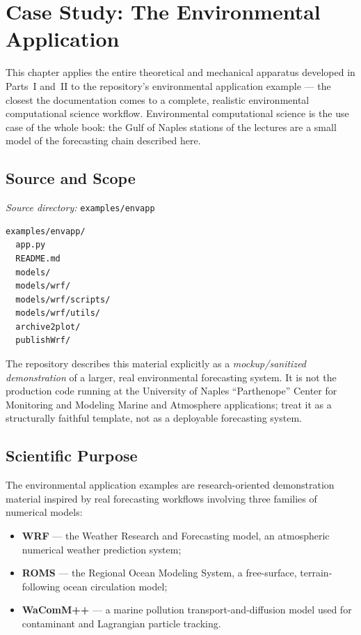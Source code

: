 \chapter{Case Study: The Environmental Application}
\label{ch:case-study}

This chapter applies the entire theoretical and mechanical apparatus
developed in Parts~I and~II to the repository's environmental application
example --- the closest the documentation comes to a complete, realistic
environmental computational science workflow. Environmental computational
science is the use case of the whole book: the Gulf of Naples stations of the
lectures are a small model of the forecasting chain described here.

\section{Source and Scope}

\begin{center}
\textit{Source directory:} \texttt{examples/envapp}
\end{center}

\begin{lstlisting}[style=bash, caption={Layout of the environmental application example.}]
examples/envapp/
  app.py
  README.md
  models/
  models/wrf/
  models/wrf/scripts/
  models/wrf/utils/
  archive2plot/
  publishWrf/
\end{lstlisting}

\begin{cautionbox}
The repository describes this material explicitly as a \emph{mockup/sanitized
demonstration} of a larger, real environmental forecasting system. It is not
the production code running at the University of Naples ``Parthenope''
Center for Monitoring and Modeling Marine and Atmosphere applications;
treat it as a structurally faithful template, not as a deployable forecasting
system.
\end{cautionbox}

\section{Scientific Purpose}

The environmental application examples are research-oriented demonstration
material inspired by real forecasting workflows involving three families of
numerical models:

\begin{itemize}[leftmargin=1.4em]
  \item \textbf{WRF} --- the Weather Research and Forecasting model, an
    atmospheric numerical weather prediction system;
  \item \textbf{ROMS} --- the Regional Ocean Modeling System, a
    free-surface, terrain-following ocean circulation model;
  \item \textbf{WaComM++} --- a marine pollution transport-and-diffusion
    model used for contaminant and Lagrangian particle tracking.
\end{itemize}

